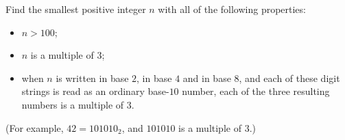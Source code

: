Find the smallest positive integer $n$ with all of the following properties:
\begin{itemize}
\item $n>100$;
\item $n$ is a multiple of $3$;
\item when $n$ is written in base $2$, in base $4$ and in base $8$, and each of these digit strings is read as an ordinary base-$10$ number, each of the three resulting numbers is a multiple of $3$.
\end{itemize}
(For example, $42=101010_2$, and $101010$ is a multiple of $3$.)
